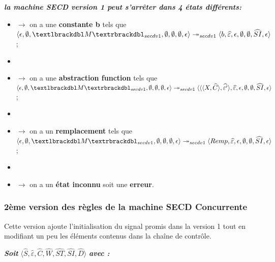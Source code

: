 \documentclass[10pt,a4paper]{article}
\begin{document}
				
				\textbf{\textit{la machine SECD version 1 peut s'arrêter dans 4 états différents:}}
				\smallbreak
				\begin{itemize}
					\item[]$\longrightarrow$ on a une \textbf{constante b} tels que $\langle \epsilon,\emptyset,\textlbrackdbl M\textrbrackdbl_{secdv1},\emptyset,\emptyset,\emptyset,\epsilon\rangle \twoheadrightarrow_{secdv1} \langle b,\widehat{\varepsilon},\epsilon,\emptyset,\emptyset,\widehat{SI},\epsilon\rangle$;
					\item[]
					\item[]$\longrightarrow$ on a une \textbf{abstraction function} tels que $\langle \epsilon,\emptyset,\textlbrackdbl M\textrbrackdbl_{secdv1},\emptyset,\emptyset,\emptyset,\epsilon\rangle \twoheadrightarrow_{secdv1} \langle\langle\langle X,\widehat{C}\rangle,\widehat{\varepsilon'}\rangle,\widehat{\varepsilon},\epsilon,\emptyset,\emptyset,\widehat{SI},\epsilon\rangle$;
					\item[]
					\item[]$\longrightarrow$ on a un \textbf{remplacement} tels que $\langle \epsilon,\emptyset,\textlbrackdbl M\textrbrackdbl_{secdv1},\emptyset,\emptyset,\emptyset,\epsilon\rangle \twoheadrightarrow_{secdv1} \langle Remp,\widehat{\varepsilon},\epsilon,\emptyset,\emptyset,\widehat{SI},\epsilon\rangle$;
					\item[]
					\item[]$\longrightarrow$ on a un \textbf{état inconnu} soit une \textbf{erreur}.
				\end{itemize}
				\newpage
				
				
				
				\subsubsection{2ème version des règles de la machine SECD Concurrente}\label{SECDConc2}
				\smallbreak
				Cette version ajoute l'initialisation du signal promis dans la version 1 tout en modifiant un peu les éléments contenus dans la chaîne de contrôle.
				\bigbreak
				
				\textbf{\textit{Soit}} $\langle\widehat{S},\widehat{\varepsilon},\widehat{C},\widehat{W},\widehat{ST},\widehat{SI},\widehat{D}\rangle$ \textbf{\textit{avec :}}
				
\end{document}
